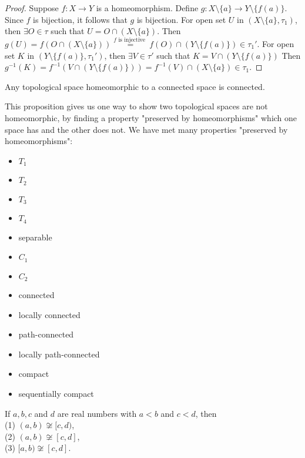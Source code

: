 \begin{proof}
    Suppose $f:X\rightarrow Y$ is a homeomorphism. 
    Define $g:X\setminus \{a\} \rightarrow Y\setminus\{f(a)\}$. 
    Since $f$ is bijection, it follows that $g$ is bijection.
    For open set $U$ in $(X\setminus \{a\},\tau_1)$, then $\exists O\in \tau$ such that $U=O\cap (X\setminus \{a\})$.
    Then $g(U)=f(O\cap (X\setminus \{a\}))\overset{f \text{ is injective }}{=} f(O)\cap (Y\setminus \{f(a)\})\in \tau_1'$.
    For open set $K$ in $(Y\setminus \{f(a)\},\tau_1')$, then $\exists V \in \tau'$ such that $K=V\cap (Y\setminus \{f(a)\})$
    Then $g^{-1}(K)=f^{-1}(V\cap (Y\setminus \{f(a)\}))=f^{-1}(V)\cap (X\setminus \{a\})\in\tau_1$.
\end{proof}

\begin{proposition}{}{}
    Any topological space homeomorphic to a connected space is connected.
\end{proposition}


This proposition gives us one way to show two topological spaces are not homeomorphic, 
by finding a property "preserved by homeomorphisms" which one space has and the other does not.
We have met many properties "preserved by homeomorphisms":
\begin{itemize}
    \item $T_1$
    \item $T_2$
    \item $T_3$
    \item $T_4$
    \item separable
    \item $C_1$
    \item $C_2$
    \item connected
    \item locally connected
    \item path-connected
    \item locally path-connected
    \item compact
    \item sequentially compact
\end{itemize}

\begin{corollary}{}{}
    If $a,b,c$ and $d$ are real numbers with $a<b$ and $c<d$, then\\
    (1) $(a,b)\not\cong [c,d)$,\\
    (2) $(a,b)\not\cong [c,d]$,\\
    (3) $[a,b)\not\cong [c,d]$.
\end{corollary}

